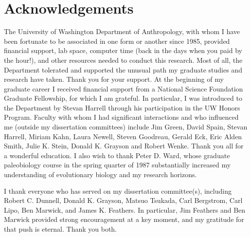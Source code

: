 





\renewcommand{\cftchapterfont}{\normalsize\normalfont}   
\renewcommand{\cftpartfont}{\normalsize\normalfont}   
\renewcommand{\cftsectionfont}{\normalsize\normalfont} 
\renewcommand{\cftsubsectionfont}{\normalsize\normalfont} 
\renewcommand*{\cftpartname}{Part\space}
\newpage
\setcounter{tocdepth}{3} 
\tableofcontents*
\cleardoublepage
\listoffigures
\cleardoublepage
\listoftables
\cleardoublepage



\clearpage
\chapter{Acknowledgements}

The University of Washington Department of Anthropology, with whom I have been fortunate to be associated in one form or another since 1985, provided financial support, lab space, computer time (back in the days when you paid by the hour!), and other resources needed to conduct this research.  Most of all, the Department tolerated and supported the unusual path my graduate studies and research have taken.  Thank you for your support.  At the beginning of my graduate career I received financial support from a National Science Foundation Graduate Fellowship, for which I am grateful.  In particular, I was introduced to the Department by Stevan Harrell through his participation in the UW Honors Program.  Faculty with whom I had significant interactions and who influenced me (outside my dissertation committees) include Jim Green, David Spain, Stevan Harrell, Miriam Kahn, Laura Newell, Steven Goodreau, Gerald Eck, Eric Alden Smith, Julie K. Stein, Donald K. Grayson and Robert Wenke.  Thank you all for a wonderful education.  I also wish to thank Peter D. Ward, whose graduate paleobiology course in the spring quarter of 1987 substantially increased my understanding of evolutionary biology and my research horizons.  

\vskip 0.3cm

I thank everyone who has served on my dissertation committee(s), including Robert C. Dunnell, Donald K. Grayson, Matsuo Tsukada, Carl Bergstrom, Carl Lipo, Ben Marwick, and James K. Feathers.  In particular, Jim Feathers and Ben Marwick provided strong encouragement at a key moment, and my gratitude for that push is eternal.  Thank you both. 


